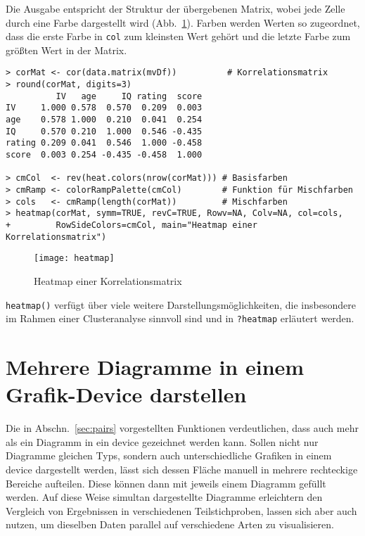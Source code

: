 Die Ausgabe entspricht der Struktur der übergebenen Matrix, wobei jede Zelle durch eine Farbe dargestellt wird (Abb.\ \ref{fig:heatmap}). Farben werden Werten so zugeordnet, dass die erste Farbe in \lstinline!col! zum kleinsten Wert gehört und die letzte Farbe zum größten Wert in der Matrix.
\begin{lstlisting}
> corMat <- cor(data.matrix(mvDf))          # Korrelationsmatrix
> round(corMat, digits=3)
          IV   age     IQ rating  score
IV     1.000 0.578  0.570  0.209  0.003
age    0.578 1.000  0.210  0.041  0.254
IQ     0.570 0.210  1.000  0.546 -0.435
rating 0.209 0.041  0.546  1.000 -0.458
score  0.003 0.254 -0.435 -0.458  1.000

> cmCol  <- rev(heat.colors(nrow(corMat))) # Basisfarben
> cmRamp <- colorRampPalette(cmCol)        # Funktion für Mischfarben
> cols   <- cmRamp(length(corMat))         # Mischfarben
> heatmap(corMat, symm=TRUE, revC=TRUE, Rowv=NA, Colv=NA, col=cols,
+         RowSideColors=cmCol, main="Heatmap einer Korrelationsmatrix")
\end{lstlisting}

\begin{figure}[ht]
\centering
\texttt{[image: heatmap]}
\vspace*{-1em}
\caption{Heatmap einer Korrelationsmatrix}
\label{fig:heatmap}
\end{figure}

\lstinline!heatmap()! verfügt über viele weitere Darstellungsmöglichkeiten, die insbesondere im Rahmen einer Clusteranalyse sinnvoll sind und in \lstinline!?heatmap! erläutert werden.

\section{Mehrere Diagramme in einem Grafik-Device darstellen}
\label{sec:diagSplit}

Die in Abschn.\ \ref{sec:pairs} vorgestellten Funktionen verdeutlichen, dass auch mehr als ein Diagramm in ein device gezeichnet werden kann. Sollen nicht nur Diagramme gleichen Typs, sondern auch unterschiedliche Grafiken in einem device dargestellt werden, lässt sich dessen Fläche manuell in mehrere rechteckige Bereiche aufteilen. Diese können dann mit jeweils einem Diagramm gefüllt werden. Auf diese Weise simultan dargestellte Diagramme erleichtern den Vergleich von Ergebnissen in verschiedenen Teilstichproben, lassen sich aber auch nutzen, um dieselben Daten parallel auf verschiedene Arten zu visualisieren.

